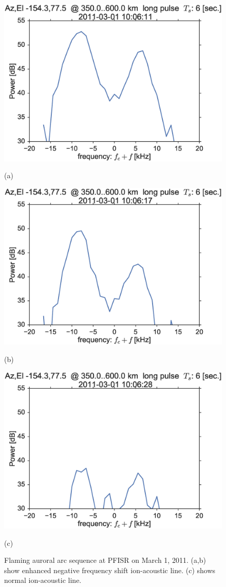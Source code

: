 \begin{figure}\centering
    \includegraphics[width=0.5\columnwidth,trim=0 50 0 0]{gfx/2011-03-01/acfslice_longpulse2011-03-0110-06-11}

    \vspace{-1cm}(a)
    \vspace{1cm}

    \includegraphics[width=0.5\columnwidth,trim=0 50 0 0]{gfx/2011-03-01/acfslice_longpulse2011-03-0110-06-17}

    \vspace{-1cm}(b)
    \vspace{1cm}

    \includegraphics[width=0.5\columnwidth,trim=0 50 0 0]{gfx/2011-03-01/acfslice_longpulse2011-03-0110-06-28}

    \vspace{-1cm}(c)
    \vspace{1cm}


	\caption{Flaming auroral arc sequence at PFISR on March 1, 2011.
    (a,b) show enhanced negative frequency shift ion-acoustic line.
    (c) shows normal ion-acoustic line.}
    \label{fig:20110301b}
\end{figure}

